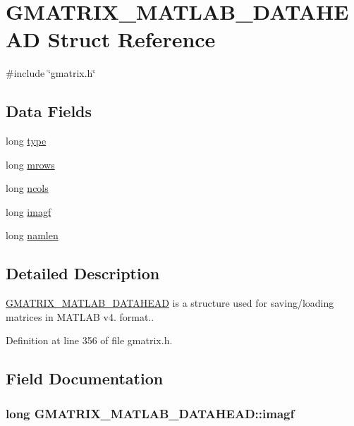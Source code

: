 \hypertarget{structGMATRIX__MATLAB__DATAHEAD}{\section{G\-M\-A\-T\-R\-I\-X\-\_\-\-M\-A\-T\-L\-A\-B\-\_\-\-D\-A\-T\-A\-H\-E\-A\-D Struct Reference}
\label{structGMATRIX__MATLAB__DATAHEAD}
}


{\ttfamily \#include \char`\"{}gmatrix.\-h\char`\"{}}

\subsection*{Data Fields}
\begin{DoxyCompactItemize}
\item 
long \hyperlink{structGMATRIX__MATLAB__DATAHEAD_a20df828adf57355259f96b10f8f7a1ab}{type}
\item 
long \hyperlink{structGMATRIX__MATLAB__DATAHEAD_aef3b07279caf1f6f1d0142bd445fb46b}{mrows}
\item 
long \hyperlink{structGMATRIX__MATLAB__DATAHEAD_ae3a5cde912aa05b9ec3f3aeca05bb6ac}{ncols}
\item 
long \hyperlink{structGMATRIX__MATLAB__DATAHEAD_aafd012288b5515a56aa5b34d7942069a}{imagf}
\item 
long \hyperlink{structGMATRIX__MATLAB__DATAHEAD_a46970f1c5a67ea0d7057eb8a1912a22d}{namlen}
\end{DoxyCompactItemize}


\subsection{Detailed Description}
\hyperlink{structGMATRIX__MATLAB__DATAHEAD}{G\-M\-A\-T\-R\-I\-X\-\_\-\-M\-A\-T\-L\-A\-B\-\_\-\-D\-A\-T\-A\-H\-E\-A\-D} is a structure used for saving/loading matrices in M\-A\-T\-L\-A\-B v4. format.. 

Definition at line 356 of file gmatrix.\-h.



\subsection{Field Documentation}
\hypertarget{structGMATRIX__MATLAB__DATAHEAD_aafd012288b5515a56aa5b34d7942069a}{
\subsubsection[{imagf}]{\setlength{\rightskip}{0pt plus 5cm}long G\-M\-A\-T\-R\-I\-X\-\_\-\-M\-A\-T\-L\-A\-B\-\_\-\-D\-A\-T\-A\-H\-E\-A\-D\-::imagf}}\label{structGMATRIX__MATLAB__DATAHEAD_aafd012288b5515a56aa5b34d7942069a}


